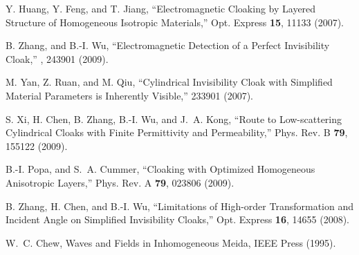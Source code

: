 \documentclass[12pt]{article} %
\begin{document}
\begin{thebibliography}{99}
 Y. Huang, Y. Feng, and T. Jiang, ``Electromagnetic Cloaking by Layered Structure of
Homogeneous Isotropic Materials,'' Opt. Express {\bf 15}, 11133
(2007).

 B. Zhang, and B.-I. Wu, ``Electromagnetic Detection of a Perfect Invisibility Cloak,'' , 243901
(2009).

 M. Yan, Z. Ruan, and M. Qiu, ``Cylindrical Invisibility Cloak with Simplified Material Parameters is Inherently Visible,''  233901 (2007).


 S. Xi, H. Chen, B. Zhang, B.-I. Wu, and J.~A. Kong, ``Route to Low-scattering Cylindrical Cloaks with Finite Permittivity and Permeability,'' Phys. Rev. B {\bf 79}, 155122 (2009).

 B.-I. Popa, and S.~A. Cummer, ``Cloaking with Optimized Homogeneous Anisotropic Layers,''  Phys. Rev. A {\bf 79}, 023806 (2009).


 B. Zhang, H. Chen, and B.-I. Wu, ``Limitations of High-order
Transformation and Incident Angle on Simplified Invisibility
Cloaks,'' Opt. Express {\bf 16}, 14655 (2008).

 W.~C. Chew, Waves and Fields in Inhomogeneous Meida,  IEEE Press (1995).





\end{thebibliography}
\end{document}
